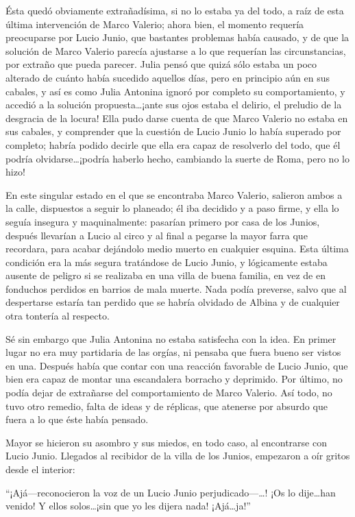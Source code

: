 \documentclass[11pt,openany]{book}
\begin{document}
Ésta quedó obviamente extrañadísima, si no lo estaba ya del todo, a raíz de esta última intervención de Marco Valerio; ahora bien, el momento requería preocuparse por Lucio Junio, que bastantes problemas había causado, y de que la solución de Marco Valerio parecía ajustarse a lo que requerían las circunstancias, por extraño que pueda parecer. Julia pensó que quizá sólo estaba un poco alterado de cuánto había sucedido aquellos días, pero en principio aún en sus cabales, y así es como Julia Antonina ignoró por completo su comportamiento, y accedió a la solución propuesta\dots ¡ante sus ojos estaba el delirio, el preludio de la desgracia de la locura! Ella pudo darse cuenta de que Marco Valerio no estaba en sus cabales, y comprender que la cuestión de Lucio Junio lo había superado por completo; habría podido decirle que ella era capaz de resolverlo del todo, que él podría olvidarse\dots ¡podría haberlo hecho, cambiando la suerte de Roma, pero no lo hizo! 

En este singular estado en el que se encontraba Marco Valerio, salieron ambos a la calle, dispuestos a seguir lo planeado; él iba decidido y a paso firme, y ella lo seguía insegura y maquinalmente: pasarían primero por casa de los Junios, después llevarían a Lucio al circo y al final a pegarse la mayor farra que recordara, para acabar dejándolo medio muerto en cualquier esquina. Esta última condición era la más segura tratándose de Lucio Junio, y lógicamente estaba ausente de peligro si se realizaba en una villa de buena familia, en vez de en fonduchos perdidos en barrios de mala muerte. Nada podía preverse, salvo que al despertarse estaría tan perdido que se habría olvidado de Albina y de cualquier otra tontería al respecto. 

Sé sin embargo que Julia Antonina no estaba satisfecha con la idea. En primer lugar no era muy partidaria de las orgías, ni pensaba que fuera bueno ser vistos en una. Después había que contar con una reacción favorable de Lucio Junio, que bien era capaz de montar una escandalera borracho y deprimido. Por último, no podía dejar de extrañarse del comportamiento de Marco Valerio. Así todo, no tuvo otro remedio, falta de ideas y de réplicas, que atenerse por absurdo que fuera a lo que éste había pensado.  

Mayor se hicieron su asombro y sus miedos, en todo caso, al encontrarse con Lucio Junio. Llegados al recibidor de la villa de los Junios, empezaron a oír gritos desde el interior: 

“¡Ajá—reconocieron la voz de un Lucio Junio perjudicado—\dots! ¡Os lo dije\dots han venido! Y ellos solos\dots ¡sin que yo les dijera nada! ¡Ajá\dots ja!” 
\end{document}
